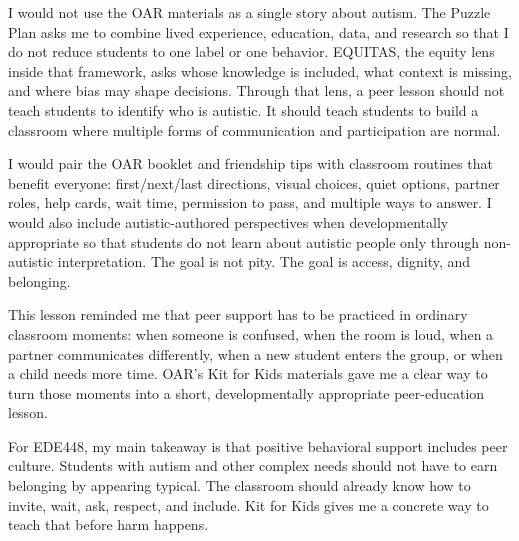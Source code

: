 \documentclass[11pt]{article}
\newcommand{\reviewsection}[1]{\vspace{0.08in}\noindent{\normalsize\bfseries\color{PrimaryRed}#1}\par\vspace{0.02in}}
\begin{document}
I would not use the OAR materials as a single story about autism. The Puzzle Plan asks me to combine lived experience, education, data, and research so that I do not reduce students to one label or one behavior. EQUITAS, the equity lens inside that framework, asks whose knowledge is included, what context is missing, and where bias may shape decisions. Through that lens, a peer lesson should not teach students to identify who is autistic. It should teach students to build a classroom where multiple forms of communication and participation are normal.

I would pair the OAR booklet and friendship tips with classroom routines that benefit everyone: first/next/last directions, visual choices, quiet options, partner roles, help cards, wait time, permission to pass, and multiple ways to answer. I would also include autistic-authored perspectives when developmentally appropriate so that students do not learn about autistic people only through non-autistic interpretation. The goal is not pity. The goal is access, dignity, and belonging.

\reviewsection{Conclusion}

This lesson reminded me that peer support has to be practiced in ordinary classroom moments: when someone is confused, when the room is loud, when a partner communicates differently, when a new student enters the group, or when a child needs more time. OAR's Kit for Kids materials gave me a clear way to turn those moments into a short, developmentally appropriate peer-education lesson.

For EDE448, my main takeaway is that positive behavioral support includes peer culture. Students with autism and other complex needs should not have to earn belonging by appearing typical. The classroom should already know how to invite, wait, ask, respect, and include. Kit for Kids gives me a concrete way to teach that before harm happens.

\newpage
\small

\end{document}
